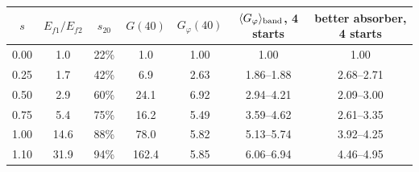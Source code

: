 \begin{tabular}{@{}ccccccc@{}}
\toprule
$s$ & $E_{f1}/E_{f2}$ & $s_{20}$ & $G(40)$ & $G_\varphi(40)$ & $\langle G_\varphi\rangle_{\rm band}$, 4 starts & better absorber, 4 starts\\ \midrule
0.00 & 1.0 & 22\% & 1.0 & 1.00 & 1.00 & 1.00\\
0.25 & 1.7 & 42\% & 6.9 & 2.63 & 1.86--1.88 & 2.68--2.71\\
0.50 & 2.9 & 60\% & 24.1 & 6.92 & 2.94--4.21 & 2.09--3.00\\
0.75 & 5.4 & 75\% & 16.2 & 5.49 & 3.59--4.62 & 2.61--3.35\\
1.00 & 14.6 & 88\% & 78.0 & 5.82 & 5.13--5.74 & 3.92--4.25\\
1.10 & 31.9 & 94\% & 162.4 & 5.85 & 6.06--6.94 & 4.46--4.95\\
\bottomrule
\end{tabular}
